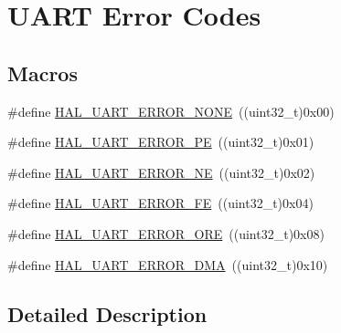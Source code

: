 \hypertarget{group___u_a_r_t___error___codes}{\section{U\-A\-R\-T Error Codes}
\label{group___u_a_r_t___error___codes}
}
\subsection*{Macros}
\begin{DoxyCompactItemize}
\item 
\#define \hyperlink{group___u_a_r_t___error___codes_ga275de35cb518c19c284764f3ecb1aac5}{H\-A\-L\-\_\-\-U\-A\-R\-T\-\_\-\-E\-R\-R\-O\-R\-\_\-\-N\-O\-N\-E}~((uint32\-\_\-t)0x00)
\item 
\#define \hyperlink{group___u_a_r_t___error___codes_gad447a37701acd199dcb653ce32917970}{H\-A\-L\-\_\-\-U\-A\-R\-T\-\_\-\-E\-R\-R\-O\-R\-\_\-\-P\-E}~((uint32\-\_\-t)0x01)
\item 
\#define \hyperlink{group___u_a_r_t___error___codes_ga4a4e32a346dd01f4c41c4fc27afbc72c}{H\-A\-L\-\_\-\-U\-A\-R\-T\-\_\-\-E\-R\-R\-O\-R\-\_\-\-N\-E}~((uint32\-\_\-t)0x02)
\item 
\#define \hyperlink{group___u_a_r_t___error___codes_gaf23cb510d4dc2c8e05a45abfbf5f3457}{H\-A\-L\-\_\-\-U\-A\-R\-T\-\_\-\-E\-R\-R\-O\-R\-\_\-\-F\-E}~((uint32\-\_\-t)0x04)
\item 
\#define \hyperlink{group___u_a_r_t___error___codes_gaedc030add6c499cf41be7f12dd95930c}{H\-A\-L\-\_\-\-U\-A\-R\-T\-\_\-\-E\-R\-R\-O\-R\-\_\-\-O\-R\-E}~((uint32\-\_\-t)0x08)
\item 
\#define \hyperlink{group___u_a_r_t___error___codes_gac1d608ae3499a449cd6cd102e7f86605}{H\-A\-L\-\_\-\-U\-A\-R\-T\-\_\-\-E\-R\-R\-O\-R\-\_\-\-D\-M\-A}~((uint32\-\_\-t)0x10)
\end{DoxyCompactItemize}


\subsection{Detailed Description}


